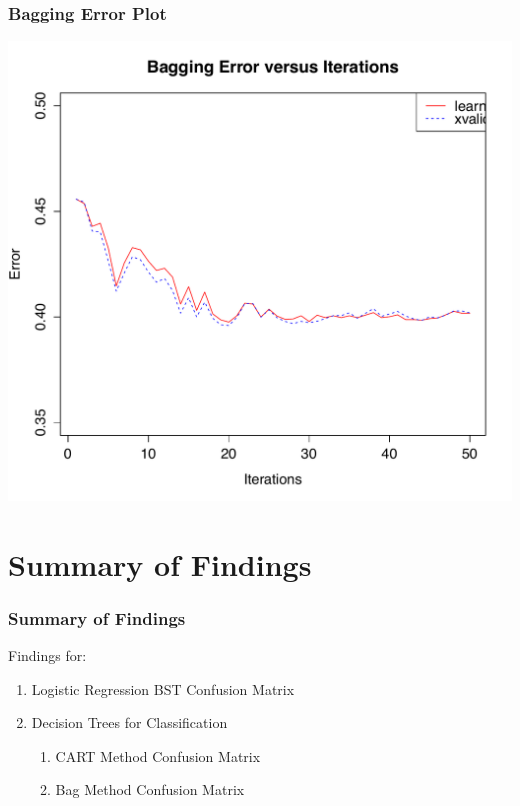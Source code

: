 \documentclass{beamer}
\begin{document}
\begin{frame}
\frametitle{Bagging Error Plot}
\begin{center} 
\includegraphics[width=.6 \textwidth]{bagError}
\end{center}
\end{frame}



\section{Summary of Findings}
\begin{frame}
\frametitle{Summary of Findings}
Findings for: 
\begin{enumerate}
\item Logistic Regression BST Confusion Matrix
\item Decision Trees for Classification
\begin{enumerate}
\item CART Method Confusion Matrix
\item Bag Method Confusion Matrix
\end{enumerate}
\end{enumerate}
\end{frame}
\end{document}

